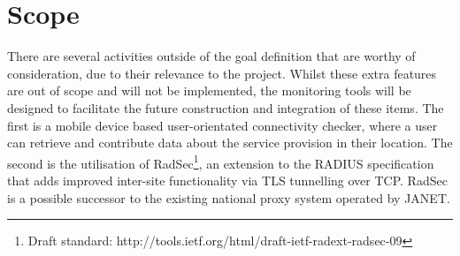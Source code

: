 \documentclass[pdflatex, a4paper,12pt]{article}
\begin{document}
\section{Scope}

There are several activities outside of the goal definition that are worthy of
consideration, due to their relevance to the project. Whilst these extra
features are out of scope and will not be implemented, the monitoring tools will
be designed to facilitate the future construction and integration of these items.
 The first is a
mobile device based user-orientated connectivity checker, where a user can
retrieve and contribute data about the service provision in their location. The
second is the utilisation of RadSec\footnote[3]{Draft standard:
http://tools.ietf.org/html/draft-ietf-radext-radsec-09}, an extension to the RADIUS specification
that adds improved inter-site functionality via TLS tunnelling over TCP. RadSec
is a possible successor to the existing national proxy system operated by JANET.
\end{document}
